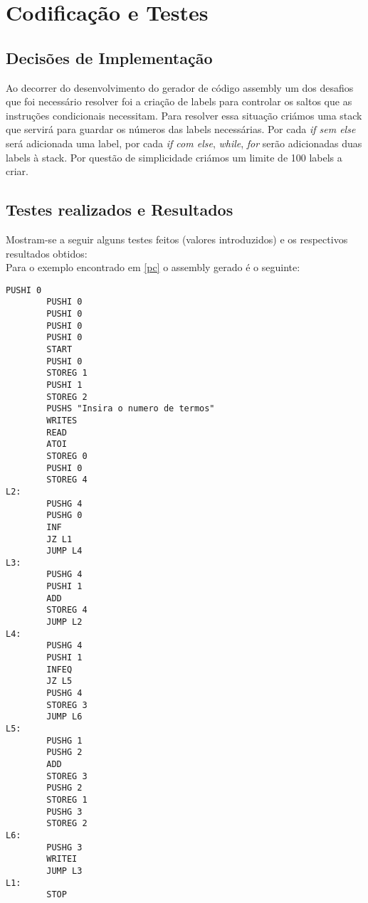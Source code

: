 \documentclass{report}
\begin{document}
\chapter{Codificação e Testes} \label {code}
\section{Decisões de Implementação}
Ao decorrer do desenvolvimento do gerador de código assembly um dos desafios que foi necessário resolver foi a criação de labels para controlar os saltos que as instruções condicionais necessitam. Para resolver essa situação criámos uma stack que servirá para guardar os números das labels necessárias. Por cada \emph{if sem else} será adicionada uma label, por cada \emph{if com else}, \emph{while}, \emph{for} serão adicionadas duas labels à stack. Por questão de simplicidade criámos um limite de 100 labels a criar.
\section{Testes realizados e Resultados}
Mostram-se a seguir alguns testes feitos (valores introduzidos) e
os respectivos resultados obtidos:\\
Para o exemplo encontrado em \ref{pc} o assembly gerado é o seguinte:
\begin{verbatim}
PUSHI 0
        PUSHI 0
        PUSHI 0
        PUSHI 0
        PUSHI 0
        START
        PUSHI 0
        STOREG 1
        PUSHI 1
        STOREG 2
        PUSHS "Insira o numero de termos"
        WRITES
        READ
        ATOI
        STOREG 0
        PUSHI 0
        STOREG 4
L2:
        PUSHG 4
        PUSHG 0
        INF
        JZ L1
        JUMP L4
L3:
        PUSHG 4
        PUSHI 1
        ADD
        STOREG 4
        JUMP L2
L4:
        PUSHG 4
        PUSHI 1
        INFEQ
        JZ L5
        PUSHG 4
        STOREG 3
        JUMP L6
L5:
        PUSHG 1
        PUSHG 2
        ADD
        STOREG 3
        PUSHG 2
        STOREG 1
        PUSHG 3
        STOREG 2
L6:
        PUSHG 3
        WRITEI
        JUMP L3
L1:
        STOP
\end{verbatim}
\end{document}
